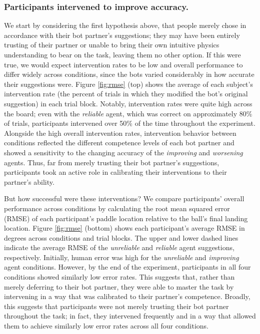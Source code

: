 \documentclass[10pt,letterpaper]{article}
\begin{document}
\subsubsection{Participants intervened to improve accuracy.} We start by considering the first hypothesis above, that people merely chose in accordance with their bot partner's suggestions; they may have been entirely trusting of their partner or unable to bring their own intuitive physics understanding to bear on the task, leaving them no other option. If this were true, we would expect intervention rates to be low and overall performance to differ widely across conditions, since the bots varied considerably in how accurate their suggestions were. Figure \ref{fig:rmse} (top) shows the average of each subject's intervention rate (the percent of trials in which they modified the bot's original suggestion) in each trial block. Notably, intervention rates were quite high across the board; even with the \textit{reliable} agent, which was correct on approximately 80\% of trials, participants intervened over 50\% of the time throughout the experiment. Alongside the high overall intervention rates, intervention behavior between conditions reflected the different competence levels of each bot partner and showed a sensitivity to the changing accuracy of the \textit{improving} and \textit{worsening} agents. Thus, far from merely trusting their bot partner's suggestions, participants took an active role in calibrating their interventions to their partner's ability.


But how successful were these interventions? We compare participants' overall performance across conditions by calculating the root mean squared error (RMSE) of each participant's paddle location relative to the ball's final landing location. Figure \ref{fig:rmse} (bottom) shows each participant's average RMSE in degrees across conditions and trial blocks. The upper and lower dashed lines indicate the average RMSE of the \textit{unreliable} and \textit{reliable} agent suggestions, respectively. Initially, human error was high for the \textit{unreliable} and \textit{improving} agent conditions. However, by the end of the experiment, participants in all four conditions showed similarly low error rates. This suggests that, rather than merely deferring to their bot partner, they were able to master the task by intervening in a way that was calibrated to their partner's competence.  Broadly, this suggests that participants were not merely trusting their bot partner throughout the task; in fact, they intervened frequently and in a way that allowed them to achieve similarly low error rates across all four conditions. 
\end{document}
